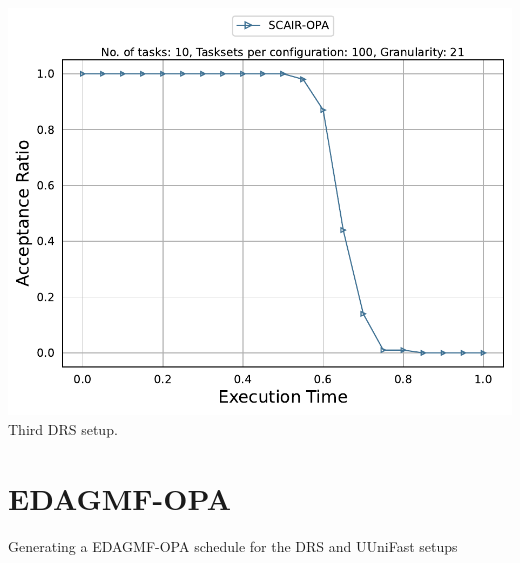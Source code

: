 \documentclass[]{article}
\begin{document}
\begin{minipage}[t]{0.48\linewidth}
            \includegraphics[width=\linewidth]{SCAIR-OPA_3rd.pdf}
		Third DRS setup.
		\vspace{0.3cm}     

	\end{minipage}

	\clearpage
	\section{EDAGMF-OPA}
{
\raggedleft Generating a EDAGMF-OPA schedule for the DRS and UUniFast setups \newline
}
\end{document}
